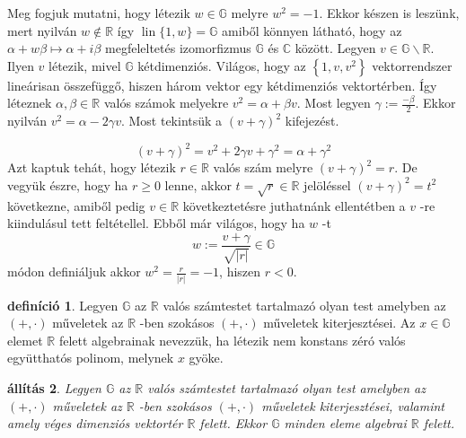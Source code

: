 \documentclass[a4paper, showtrims]{memoir}
\makeatletter
\renewenvironment{proof}[1][\proofname]
    {\par\pushQED{\qed}%
    \normalfont \topsep6\p@\@plus6\p@\relax
    \trivlist
    \item[\hskip\labelsep
        \itshape
    #1\@addpunct{:}]\ignorespaces}
    {\popQED\endtrivlist\@endpefalse}
\theoremstyle{plain}
\newtheorem{proposition}{állítás}[chapter]
\theoremstyle{remark}
\theoremstyle{definition}
\newtheorem{definition}[proposition]{definíció}
\DeclareMathOperator{\lin}{lin}
\makeatother
\begin{document}
\begin{proof}
	Meg fogjuk mutatni, hogy létezik $w\in \mathbb{G}$ melyre $w^{2}=-1$.
	Ekkor
	készen is leszünk, mert nyilván $w\notin \mathbb{R}$ így $\lin\{1,w\}=\mathbb{G}$ amiből könnyen látható, hogy
	az $\alpha +w\beta \longmapsto \alpha +i\beta $ megfeleltetés
	izomorfizmus $\mathbb{G}$ és $\mathbb{C}$ között.
	\newline
	Legyen $v\in \mathbb{G}\smallsetminus \mathbb{R}$.
	Ilyen $v$ létezik, mivel $\mathbb{G}
	$ kétdimenziós.
	Világos, hogy az $\left\{
		1,v,v^{2}\right\} $ vektorrendszer lineárisan összefüggő,
	hiszen három vektor egy kétdimenziós vektortérben.
	\'{I}gy léteznek $\alpha ,\beta \in \mathbb{R}$ valós számok melyekre $v^{2}=\alpha +\beta v$.
	Most legyen $\gamma :=\frac{-\beta }{2}
	$.
	Ekkor nyilván $v^{2}=\alpha -2\gamma v$.
	Most tekintsük a $\left(
		v+\gamma \right) ^{2}$ kifejezést.

	\[
		\left( v+\gamma \right) ^{2}=v^{2}+2\gamma v+\gamma ^{2}=\alpha +\gamma ^{2}
	\]
	Azt kaptuk tehát, hogy létezik $r\in \mathbb{R}$ valós szám
	melyre $\left( v+\gamma \right) ^{2}=r$.
	De vegyük észre, hogy ha $r\geq 0$ lenne,
	akkor $t=\sqrt{r}\in\mathbb{R}$
	jelöléssel $\left( v+\gamma \right)^2=t^2$ következne, amiből pedig $v\in \mathbb{R}$ következtetésre juthatnánk ellentétben a $v$ -re kiindulásul tett feltétellel.
	Ebből már
	világos, hogy ha $w$ -t
	\[
		w:=\frac{v+\gamma }{\sqrt{\left| r\right| }}\in \mathbb{G}
	\]
	módon definiáljuk akkor $w^{2}=\frac{r}{\left| r\right| }=-1$,
	hiszen $r<0$.
\end{proof}

\begin{definition}
	Legyen $\mathbb{G}$ az $\mathbb{R}$ valós számtestet tartalmazó olyan
	test amelyben az $\left( +,\cdot \right) $ műveletek az $\mathbb{R}$ -ben
	szokásos $\left( +,\cdot \right) $ műveletek kiterjesztései.
	Az $x\in \mathbb{G}$ elemet $\mathbb{R}$ felett algebrainak nevezzük, ha létezik nem konstans zéró valós együtthatós polinom,
	melynek $x$ gyöke.
\end{definition}

\begin{proposition}
	Legyen $\mathbb{G}$ az $\mathbb{R}$ valós számtestet tartalmazó olyan
	test amelyben az $\left( +,\cdot \right) $ műveletek az $\mathbb{R}$ -ben
	szokásos $\left( +,\cdot \right) $ műveletek kiterjesztései,
	valamint amely véges dimenziós vektortér $\mathbb{R}$ felett.
	Ekkor $\mathbb{G}$ minden eleme algebrai $\mathbb{R}$ felett.
\end{proposition}
\end{document}
